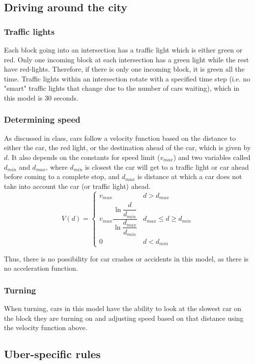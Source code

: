 \documentclass{article}
\begin{document}
\subsection{Driving around the city}
\subsubsection{Traffic lights}
Each block going into an intersection has a traffic light which is either green or red. Only one incoming block at each intersection has a green light while the rest have red-lights. Therefore, if there is only one incoming block, it is green all the time. Traffic lights within an intersection rotate with a specified time step (i.e. no "smart" traffic lights that change due to the number of cars waiting), which in this model is 30 seconds.

\subsubsection{Determining speed}
As discussed in class, cars follow a velocity function based on the distance to either the car, the red light, or the destination ahead of the car, which is given by $d$. It also depends on the constants for speed limit ($v_{max}$) and two variables called $d_{min}$ and $d_{max}$, where $d_{min}$ is closest the car will get to a traffic light or car ahead before coming to a complete stop, and $d_{max}$ is distance at which a car does not take into account the car (or traffic light) ahead.
\[V(d) = \begin{cases} 
      	v_{max} & d > d_{max}\\
      	v_{max} \dfrac{\ln{\dfrac{d}{d_{min}}}}{\ln{\dfrac{d_{max}}{d_{min}}}} & d_{max} \leq d \geq d_{min}\\
      	0 & d < d_{min} 
   	\end{cases}\]

Thus, there is no possibility for car crashes or accidents in this model, as there is no acceleration function.

\subsubsection{Turning}
When turning, cars in this model have the ability to look at the slowest car on the block they are turning on and adjusting speed based on that distance using the velocity function above.

\subsection{Uber-specific rules}
\end{document}
